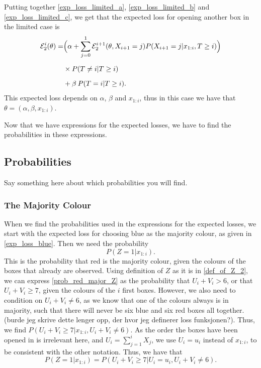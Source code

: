 Putting together \eqref{exp_loss_limited_a}, \eqref{exp_loss_limited_b} and \eqref{exp_loss_limited_c}, we get that the expected loss for opening another box in the limited case is
\begin{equation}
\label{exp_loss_limited_final}
    \begin{aligned}
        \mathcal{E}^i_{2}(\theta) 
        =& \Big( \alpha + \sum_{j=0}^1 \mathcal{E}^{i+1}_{2}(\theta,X_{i+1}=j) P(X_{i+1}=j|x_{1:i},T\geq i) \Big) \\[6pt]
        &\times P(T \neq i|T\geq i)\\[6pt]
        &+ \beta \: P(T=i|T\geq i).
    \end{aligned}
\end{equation}
This expected loss depends on $\alpha$, $\beta$ and $x_{1:i}$, thus in this case we have that $\theta = (\alpha,\beta,x_{1:i})$.

Now that we have expressions for the expected losses, we have to find the probabilities in these expressions. 

\subsection{Probabilities}
Say something here about which probabilities you will find. 

\subsubsection{The Majority Colour}
When we find the probabilities used in the expressions for the expected losses, we start with the expected loss for choosing blue as the majority colour, as given in \eqref{exp_loss_blue}. Then we need the probability
\begin{equation}
\label{prob_red_major_Z}
    P(Z=1|x_{1:i}).
\end{equation}
This is the probability that red is the majority colour, given the colours of the boxes that already are observed. Using definition of $Z$ as it is in \eqref{def_of_Z_2}, we can express \eqref{prob_red_major_Z} as the probability that $U_i+V_i>6$, or that $U_i+V_i \geq 7$, given the colours of the $i$ first boxes. However, we also need to condition on $U_i+V_i \neq 6$, as we know that one of the colours always is in majority, such that there will never be six blue and six red boxes all together. (burde jeg skrive dette lenger opp, der hvor jeg definerer loss funksjonen?). Thus, we find $P(U_i+V_i \geq 7 | x_{1:i},U_i+V_i \neq 6)$. As the order the boxes have been opened in is irrelevant here, and $U_i = \sum_{j=1}^i X_j$, we use $U_i=u_i$ instead of $x_{1:i}$, to be consistent with the other notation. Thus, we have that
\begin{equation}
\label{Z_to_U_and_V}
    P(Z=1|x_{1:i}) = P(U_i+V_i \geq 7 | U_i=u_i,U_i+V_i \neq 6).
\end{equation}

